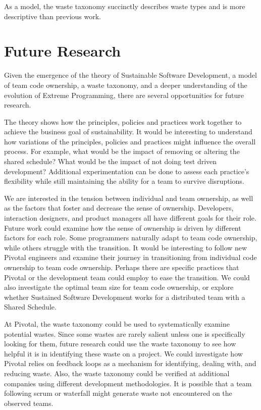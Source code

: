 As a model, the waste taxonomy succinctly describes waste types and is more descriptive than previous work. 

\section{Future Research}
Given the emergence of the theory of Sustainable Software Development, a model of team code ownership, a waste taxonomy, and a deeper understanding of the evolution of Extreme Programming, there are several opportunities for future research.

The theory shows how the principles, policies and practices work together to achieve the business goal of sustainability. It would be interesting to understand how variations of the principles, policies and practices might influence the overall process. For example, what would be the impact of removing or altering the shared schedule? What would be the impact of not doing test driven development? Additional experimentation can be done to assess each practice's flexibility while still maintaining the ability for a team to survive disruptions. 


We are interested in the tension between individual and team ownership, as well as the factors that foster and decrease the sense of ownership. Developers, interaction designers, and product managers all have different goals for their role. Future work could examine how the sense of ownership is driven by different factors for each role. Some programmers naturally adapt to team code ownership, while others struggle with the transition. It would be interesting to follow new Pivotal engineers and examine their journey in transitioning from individual code ownership to team code ownership. Perhaps there are specific practices that Pivotal or the development team could employ to ease the transition. We could also investigate the optimal team size for team code ownership, or explore whether Sustained Software Development works for a distributed team with a Shared Schedule.

At Pivotal, the waste taxonomy could be used to systematically examine potential wastes. Since some wastes are rarely salient unless one is specifically looking for them, future research could use the waste taxonomy to see how helpful it is in identifying these waste on a project. We could investigate how Pivotal relies on feedback loops as a mechanism for identifying, dealing with, and reducing waste. Also, the waste taxonomy could be verified at additional companies using different development methodologies. It is possible that a team following scrum or waterfall might generate waste not encountered on the observed teams. 

